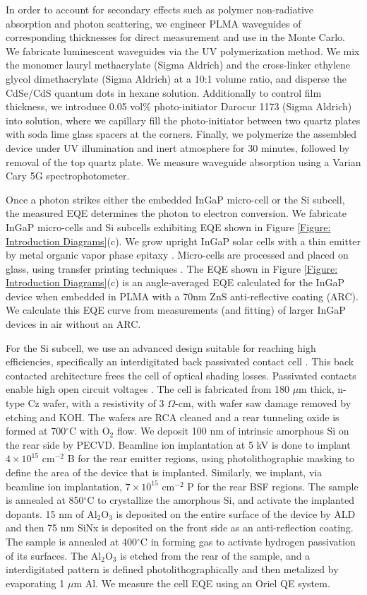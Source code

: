 \documentclass[conference]{./pvsctran}
\begin{document}
		In order to account for secondary effects such as polymer non-radiative absorption and photon scattering, we engineer PLMA waveguides of corresponding thicknesses for direct measurement and use in the Monte Carlo. We fabricate luminescent waveguides via the UV polymerization method. We mix the monomer lauryl methacrylate (Sigma Aldrich) and the cross-linker ethylene glycol dimethacrylate (Sigma Aldrich) at a 10:1 volume ratio, and disperse the CdSe/CdS quantum dots in hexane solution. Additionally to control film thickness, we introduce 0.05 vol\% photo-initiator Darocur 1173 (Sigma Aldrich) into solution, where we capillary fill the photo-initiator between two quartz plates with soda lime glass spacers at the corners. Finally, we polymerize the assembled device under UV illumination and inert atmosphere for 30 minutes, followed by removal of the top quartz plate. We measure waveguide absorption using a Varian Cary 5G spectrophotometer.
		
		Once a photon strikes either the embedded InGaP micro-cell or the Si subcell, the measured EQE determines the photon to electron conversion. We fabricate InGaP micro-cells and Si subcells exhibiting EQE shown in Figure \ref{Figure: Introduction Diagrams}(c). We grow upright InGaP solar cells with a thin emitter by metal organic vapor phase epitaxy \cite{Geisz2013} . Micro-cells are processed and placed on glass, using transfer printing techniques \cite{Carlson2012}. The EQE shown in Figure \ref{Figure: Introduction Diagrams}(c) is an angle-averaged EQE calculated for the InGaP device when embedded in PLMA with a 70nm ZnS anti-reflective coating (ARC). We calculate this EQE curve from measurements (and fitting) of larger InGaP devices in air without an ARC. 
		
		For the Si subcell, we use an advanced design suitable for reaching high efficiencies, specifically an interdigitated back passivated contact cell \cite{Efficiency2016}. This back contacted architecture frees the cell of optical shading losses. Passivated contacts enable high open circuit voltages \cite{Feldmann2014, Romer2015}. The cell is fabricated from 180 $\mu$m thick, n-type Cz wafer, with a resistivity of 3 $\Omega$-cm, with wafer saw damage removed by etching and KOH. The wafers are RCA cleaned and a rear tunneling oxide is formed at 700$^\circ$C with O$_2$ flow. We deposit 100 nm of intrinsic amorphous Si on the rear side by PECVD. Beamline ion implantation at 5 kV is done to implant $4\times 10^{15}$ cm$^{-2}$ B for the rear emitter regions, using photolithographic masking to define the area of the device that is implanted. Similarly, we implant, via beamline ion implantation, $7\times 10^{15}$ cm$^{-2}$ P for the rear BSF regions. The sample is annealed at 850$^\circ$C to crystallize the amorphous Si, and activate the implanted dopants. 15 nm of Al$_2$O$_3$ is deposited on the entire surface of the device by ALD and then 75 nm SiNx is deposited on the front side as an anti-reflection coating. The sample is annealed at 400$^\circ$C in forming gas to activate hydrogen passivation of its surfaces. The Al$_2$O$_3$ is etched from the rear of the sample, and a interdigitated pattern is defined photolithographically and then metalized by evaporating 1 $\mu$m Al. We measure the cell EQE using an Oriel QE system. 
		
\end{document}
